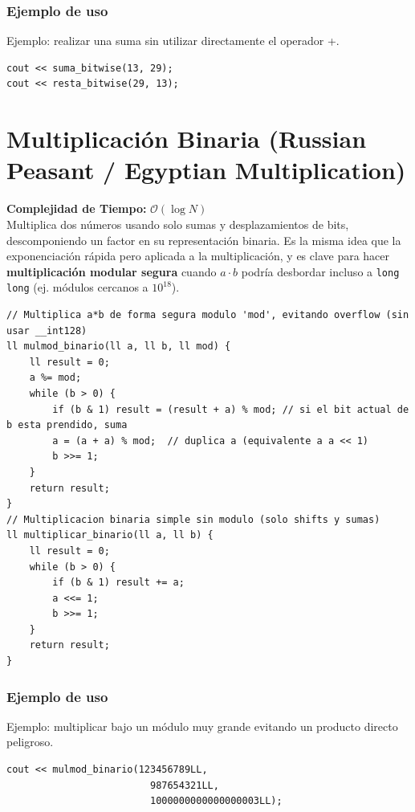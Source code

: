 \documentclass[10pt,twocolumn,letterpaper]{report}
\begin{document}
\subsubsection*{Ejemplo de uso}
Ejemplo: realizar una suma sin utilizar directamente el operador +.
\begin{lstlisting}
cout << suma_bitwise(13, 29);
cout << resta_bitwise(29, 13);
\end{lstlisting}

\section{Multiplicación Binaria (Russian Peasant / Egyptian Multiplication)}
\textbf{Complejidad de Tiempo:} $\mathcal{O}(\log N)$ \\
Multiplica dos números usando solo sumas y desplazamientos de bits, descomponiendo un factor en su representación binaria. Es la misma idea que la exponenciación rápida pero aplicada a la multiplicación, y es clave para hacer \textbf{multiplicación modular segura} cuando $a \cdot b$ podría desbordar incluso a \texttt{long long} (ej. módulos cercanos a $10^{18}$).
\begin{lstlisting}
// Multiplica a*b de forma segura modulo 'mod', evitando overflow (sin usar __int128)
ll mulmod_binario(ll a, ll b, ll mod) {
    ll result = 0;
    a %= mod;
    while (b > 0) {
        if (b & 1) result = (result + a) % mod; // si el bit actual de b esta prendido, suma
        a = (a + a) % mod;  // duplica a (equivalente a a << 1)
        b >>= 1;
    }
    return result;
}
// Multiplicacion binaria simple sin modulo (solo shifts y sumas)
ll multiplicar_binario(ll a, ll b) {
    ll result = 0;
    while (b > 0) {
        if (b & 1) result += a;
        a <<= 1;
        b >>= 1;
    }
    return result;
}
\end{lstlisting}
\subsubsection*{Ejemplo de uso}
Ejemplo: multiplicar bajo un módulo muy grande evitando un producto directo peligroso.
\begin{lstlisting}
cout << mulmod_binario(123456789LL,
                         987654321LL,
                         1000000000000000003LL);
\end{lstlisting}
\end{document}
